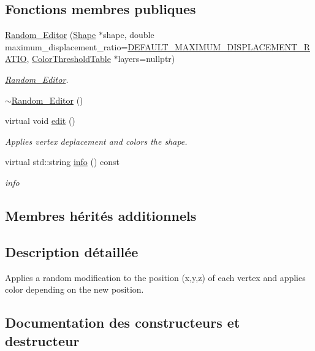 \subsection*{Fonctions membres publiques}
\begin{DoxyCompactItemize}
\item 
\hyperlink{class_random___editor_a68118d2b9929e7c9dbb821ce76554164}{Random\+\_\+\+Editor} (\hyperlink{class_shape}{Shape} $\ast$shape, double maximum\+\_\+displacement\+\_\+ratio=\hyperlink{editor_8h_ad4ef0738a1a62405f443237adf55b8c8}{D\+E\+F\+A\+U\+L\+T\+\_\+\+M\+A\+X\+I\+M\+U\+M\+\_\+\+D\+I\+S\+P\+L\+A\+C\+E\+M\+E\+N\+T\+\_\+\+R\+A\+T\+IO}, \hyperlink{thresholdtable_8h_ab0deb49d07758f9814993774cb9935cc}{Color\+Threshold\+Table} $\ast$layers=nullptr)
\begin{DoxyCompactList}\small\item\em \hyperlink{class_random___editor}{Random\+\_\+\+Editor}. \end{DoxyCompactList}\item 
\hyperlink{class_random___editor_a8a062c4450faafac081ff65b7465545d}{$\sim$\+Random\+\_\+\+Editor} ()
\item 
virtual void \hyperlink{class_random___editor_abea41199b1502f89be0b2914b3c191fc}{edit} ()
\begin{DoxyCompactList}\small\item\em Applies vertex deplacement and colors the shape. \end{DoxyCompactList}\item 
virtual std\+::string \hyperlink{class_random___editor_aa194991b2926aeab96ad5470f549f087}{info} () const
\begin{DoxyCompactList}\small\item\em info \end{DoxyCompactList}\end{DoxyCompactItemize}
\subsection*{Membres hérités additionnels}


\subsection{Description détaillée}
Applies a random modification to the position (x,y,z) of each vertex and applies color depending on the new position. 

\subsection{Documentation des constructeurs et destructeur}
\mbox{\label{class_random___editor_a68118d2b9929e7c9dbb821ce76554164}} 
